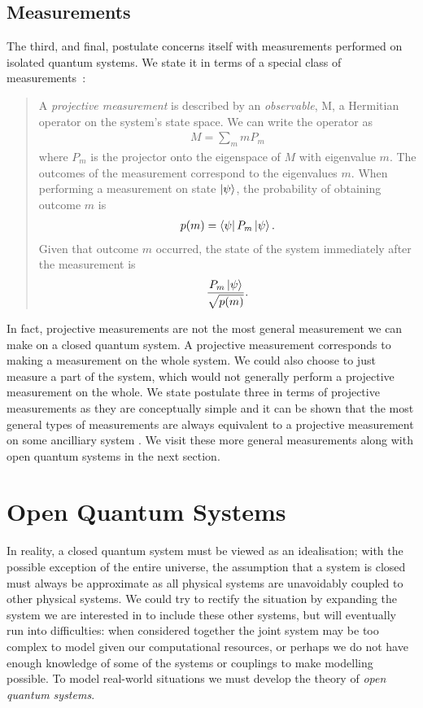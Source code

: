\subsection{Measurements}

The third, and final, postulate concerns itself with measurements performed on isolated quantum systems. We state it in terms of a special class of measurements~\cite{nielsen+chuang}:
\begin{quotation}
  A \textit{projective measurement} is described by an \textit{observable}, M, a Hermitian operator on the system's state space. We can write the operator as
  \begin{align}
    M = \sum_m mP_m
  \end{align}
  where $P_m$ is the projector onto the eigenspace of $M$ with eigenvalue $m$. The outcomes of the measurement correspond to the eigenvalues $m$. When performing a measurement on state $\left\vert\psi\right\rangle$, the probability of obtaining outcome $m$ is
  \begin{align}
    p(m) = \left\langle \psi\right\vert P_m\left\vert\psi\right\rangle.
  \end{align}
  Given that outcome $m$ occurred, the state of the system immediately after the measurement is
  \begin{align}
    \frac{P_m\left\vert\psi\right\rangle}{\sqrt{p(m)}}.
  \end{align}
\end{quotation}
In fact, projective measurements are not the most general measurement we can make on a closed quantum system. A projective measurement corresponds to making a measurement on the whole system. We could also choose to just measure a part of the system, which would not generally perform a projective measurement on the whole. We state postulate three in terms of projective measurements as they are conceptually simple and it can be shown that the most general types of measurements are always equivalent to a projective measurement on some ancilliary system \cite{peres}. We visit these more general measurements along with open quantum systems in the next section.


\section{Open Quantum Systems}

In reality, a closed quantum system must be viewed as an idealisation; with the possible exception of the entire universe, the assumption that a system is closed must always be approximate as all physical systems are unavoidably coupled to other physical systems. We could try to rectify the situation by expanding the system we are interested in to include these other systems, but will eventually run into difficulties: when considered together the joint system may be too complex to model given our computational resources, or perhaps we do not have enough knowledge of some of the systems or couplings to make modelling possible. To model real-world situations we must develop the theory of \textit{open quantum systems}. 

